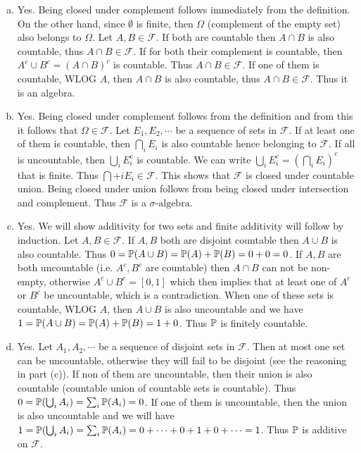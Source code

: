 \begin{solution}
	\begin{enumerate}[(a)]
		\item Yes. Being closed under complement follows immediately from the definition. On the other hand, since $ \emptyset $ is finite, then $ \Omega $ (complement of the empty set) also belongs to $ \Omega $.  Let $ A,B \in \mathcal{F} $. If both are countable then $ A\cap B $ is also countable, thus $ A\cap B \in \mathcal{F} $. If for both their complement is countable, then $ A^c \cup B^c = (A\cap B)^c $ is countable. Thus $ A\cap B \in \mathcal{F} $. If one of them is countable, WLOG $ A $, then $ A\cap B $ is also countable, thus $ A\cap B \in \mathcal{F} $. Thus it is an algebra.  
		\item Yes. Being closed under complement follows from the definition and from this it follows that $ \Omega \in \mathcal{F} $. Let $ E_1,E_2,\cdots $ be a sequence of sets in $ \mathcal{F} $. If at least one of them is countable, then $ \bigcap_i E_i $ is also countable hence belonging to $ \mathcal{F} $. If all is uncountable, then $ \bigcup_i E^c_i $ is countable. We can write $ \bigcup_i E^c_i = (\bigcap_i E_i)^c $ that is finite. Thus $ \bigcap+i E_i \in \mathcal{F} $. This shows that $ \mathcal{F} $ is closed under countable union. Being closed under union follows from being closed under intersection and complement. Thus $ \mathcal{F} $ is a $\sigma\text{-algebra}$.
		\item Yes. We will show additivity for two sets and finite additivity will follow by induction. Let $ A,B \in \mathcal{F} $. If $ A,B $ both are disjoint countable then $ A\cup B $ is also countable. Thus $ 0= \mathbb{P}(A\cup B) = \mathbb{P}(A) + \mathbb{P}(B) = 0+0 = 0 $. If $ A, B $ are both uncountable (i.e. $ A^c, B^c $ are countable) then $ A\cap B $ can not be non-empty, otherwise $ A^c\cup B^c = [0,1] $ which then implies that at least one of $ A^c $ or $ B^c $ be uncountable, which is a contradiction. When one of these sets is countable, WLOG $ A $, then $ A\cup B $ is also uncountable and we have $ 1 = \mathbb{P}(A\cup B) = \mathbb{P}(A) + \mathbb{P}(B) = 1 + 0 $. Thus $ \mathbb{P} $ is finitely countable.
		\item Yes. Let $ A_1,A_2,\cdots $ be a sequence of disjoint sets in $ \mathcal{F} $. Then at most one set can be uncountable, otherwise they will fail to be disjoint (see the reasoning in part (c)). If non of them are uncountable, then their union is also countable (countable union of countable sets is countable). Thus $ 0 = \mathbb{P}(\bigcup_i A_i) = \sum_i \mathbb{P}(A_i) = 0 $. If one of them is uncountable, then the union is also uncountable and we will have $ 1 = \mathbb{P}(\bigcup_i A_i) = \sum_i \mathbb{P}(A_i) = 0 +\cdots + 0 + 1 + 0 + \cdots = 1 $. Thus $ \mathbb{P} $ is additive on $ \mathcal{F} $.
	\end{enumerate}
\end{solution}

